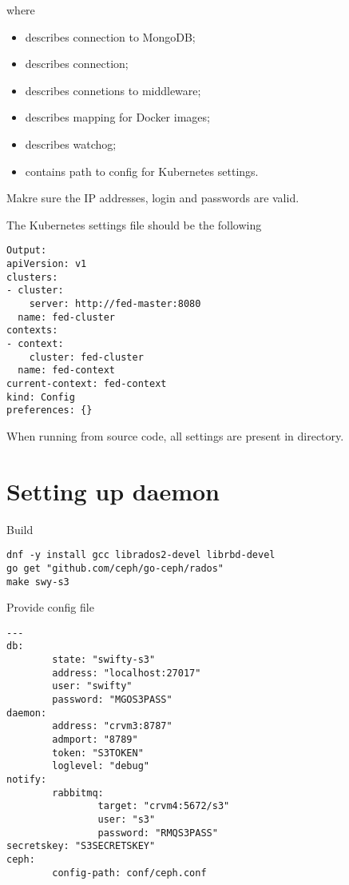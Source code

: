 where
\begin{itemize}
\item{ describes connection to MongoDB;}
\item{ describes  connection;}
\item{ describes connetions to middleware;}
\item{ describes mapping for Docker images;}
\item{ describes  watchog;}
\item{ contains path to config for Kubernetes settings.}
\end{itemize}

Makre sure the IP addresses, login and passwords are valid.

The Kubernetes settings file should be the following

\begin{lstlisting}
Output:
apiVersion: v1
clusters:
- cluster:
    server: http://fed-master:8080
  name: fed-cluster
contexts:
- context:
    cluster: fed-cluster
  name: fed-context
current-context: fed-context
kind: Config
preferences: {}
\end{lstlisting}

When running from  source code, all settings are present
in  directory.

\section{Setting up  daemon}
\label{sec:setup-swy-s3}

Build 

\begin{lstlisting}
dnf -y install gcc librados2-devel librbd-devel
go get "github.com/ceph/go-ceph/rados"
make swy-s3
\end{lstlisting}

Provide config file 

\begin{lstlisting}
---
db:
        state: "swifty-s3"
        address: "localhost:27017"
        user: "swifty"
        password: "MGOS3PASS"
daemon:
        address: "crvm3:8787"
        admport: "8789"
        token: "S3TOKEN"
        loglevel: "debug"
notify:
        rabbitmq:
                target: "crvm4:5672/s3"
                user: "s3"
                password: "RMQS3PASS"
secretskey: "S3SECRETSKEY"
ceph:
        config-path: conf/ceph.conf
\end{lstlisting}

